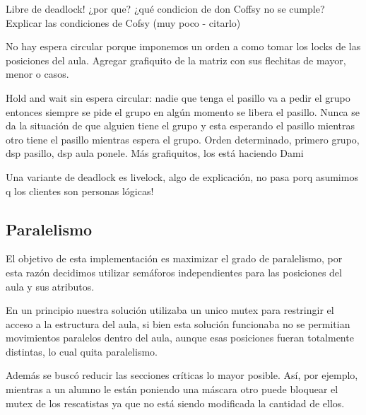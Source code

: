 Libre de deadlock! ¿por que? ¿qué condicion de don Coffsy no se cumple?
Explicar las condiciones de Cofsy (muy poco - citarlo)

No hay espera circular porque imponemos un orden a como tomar los locks de las posiciones del aula. 
Agregar grafiquito de la matriz con sus flechitas de mayor, menor o casos.

Hold and wait sin espera circular: nadie que tenga el pasillo va a pedir el grupo entonces siempre se pide el grupo en algún momento se libera el pasillo.
Nunca se da la situación de que alguien tiene el grupo y esta esperando el pasillo mientras otro tiene el pasillo mientras espera el grupo.
Orden determinado, primero grupo, dsp pasillo, dsp aula ponele.
Más grafiquitos, los está haciendo Dami

Una variante de deadlock es livelock, algo de explicación, no pasa porq asumimos q los clientes son personas lógicas!

\subsection{Paralelismo}
El objetivo de esta implementación es maximizar el grado de paralelismo, por esta razón decidimos utilizar semáforos independientes para las posiciones
del aula y sus atributos.

En un principio nuestra solución utilizaba un unico mutex para restringir el acceso a la estructura del aula, si bien esta solución funcionaba
no se permitian movimientos paralelos dentro del aula, aunque esas posiciones fueran totalmente distintas, lo cual quita paralelismo.

Además se buscó reducir las secciones críticas lo mayor posible. Así, por ejemplo, mientras a un alumno le están poniendo una máscara otro puede bloquear el mutex
de los rescatistas ya que no está siendo modificada la cantidad de ellos.

